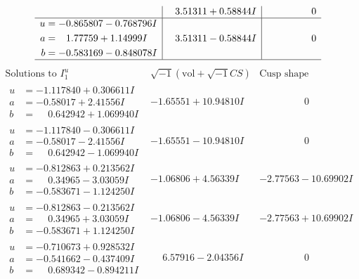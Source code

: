 \documentclass[1p]{elsarticle_modified}
\theoremstyle{definition}
\newcommand{\I}{\sqrt{-1}}
\begin{document}
$$\begin{array}{c|c|c}
 & \phantom{-}3.51311 + 0.58844 I & \phantom{-0.000000 } 0 \\ \hline\begin{aligned}
u &= -0.865807 - 0.768796 I \\
a &= \phantom{-}1.77759 + 1.14999 I \\
b &= -0.583169 - 0.848078 I\end{aligned}
 & \phantom{-}3.51311 - 0.58844 I & \phantom{-0.000000 } 0\\
 \hline 
 \end{array}$$\newpage$$\begin{array}{c|c|c}  
\text{Solutions to }I^u_{1}& \I (\text{vol} + \sqrt{-1}CS) & \text{Cusp shape}\\
 \hline 
\begin{aligned}
u &= -1.117840 + 0.306611 I \\
a &= -0.58017 + 2.41556 I \\
b &= \phantom{-}0.642942 + 1.069940 I\end{aligned}
 & -1.65551 + 10.94810 I & \phantom{-0.000000 } 0 \\ \hline\begin{aligned}
u &= -1.117840 - 0.306611 I \\
a &= -0.58017 - 2.41556 I \\
b &= \phantom{-}0.642942 - 1.069940 I\end{aligned}
 & -1.65551 - 10.94810 I & \phantom{-0.000000 } 0 \\ \hline\begin{aligned}
u &= -0.812863 + 0.213562 I \\
a &= \phantom{-}0.34965 - 3.03059 I \\
b &= -0.583671 - 1.124250 I\end{aligned}
 & -1.06806 + 4.56339 I & -2.77563 - 10.69902 I \\ \hline\begin{aligned}
u &= -0.812863 - 0.213562 I \\
a &= \phantom{-}0.34965 + 3.03059 I \\
b &= -0.583671 + 1.124250 I\end{aligned}
 & -1.06806 - 4.56339 I & -2.77563 + 10.69902 I \\ \hline\begin{aligned}
u &= -0.710673 + 0.928532 I \\
a &= -0.541662 - 0.437409 I \\
b &= \phantom{-}0.689342 - 0.894211 I\end{aligned}
 & \phantom{-}6.57916 - 2.04356 I & \phantom{-0.000000 } 0 \\ \hline\begin{aligned}

\end{aligned}
\end{array}$$
\end{document}
